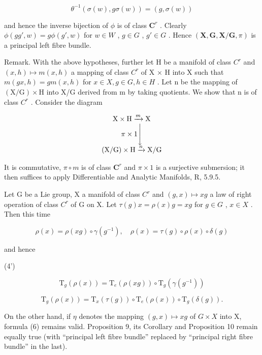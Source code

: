 \[
\theta^ {- 1} (\sigma (w), g \sigma (w)) = (g, \sigma (w))
\]

and hence the inverse bijection of \(\phi\) is of class \(\mathbf{C}^r\) . Clearly \(\phi(gg', w) = g\phi(g', w)\) for \(w \in W\) , \(g \in G\) , \(g' \in G\) . Hence \((\mathbf{X}, \mathbf{G}, \mathbf{X}/\mathbf{G}, \pi)\) is a principal left fibre bundle.

Remark. With the above hypotheses, further let H be a manifold of class \(C^{r}\) and \((x, h) \mapsto m(x, h)\) a mapping of class \(C^{r}\) of X × H into X such that \(m(gx, h) = gm(x, h)\) for \(x \in X, g \in G, h \in H\) . Let n be the mapping of \((\mathrm{X}/\mathrm{G}) \times \mathrm{H}\) into X/G derived from m by taking quotients. We show that n is of class \(C^{r}\) . Consider the diagram

\[
\begin{array}{c} \mathrm{X} \times \mathrm{H} \xrightarrow {m} \mathrm{X} \\ \pi \times 1 \Biggl \downarrow \\ (\mathrm{X} / \mathrm{G}) \times \mathrm{H} \xrightarrow {n} \mathrm{X} / \mathrm{G} \end{array}
\]

It is commutative, \(\pi \circ m\) is of class \(\mathbf{C}^r\) and \(\pi \times 1\) is a surjective submersion; it then suffices to apply Differentiable and Analytic Manifolds, R, 5.9.5.

Let G be a Lie group, X a manifold of class \(C^{r}\) and \((g, x) \mapsto xg\) a law of right operation of class \(C^{r}\) of G on X. Let \(\tau(g)x = \rho(x)g = xg\) for \(g \in G\) , \(x \in X\) . Then this time

\[
\rho (x) = \rho (x g) \circ \gamma (g ^ {- 1}), \quad \rho (x) = \tau (g) \circ \rho (x) \circ \delta (g)\tag{3'}
\]

and hence

(4')

\[
\mathrm{T} _ {g} (\rho (x)) = \mathrm{T} _ {e} (\rho (x g)) \circ \mathrm{T} _ {g} (\gamma (g ^ {- 1}))\tag{5'}
\]

\[
\mathrm{T} _ {g} (\rho (x)) = \mathrm{T} _ {x} (\tau (g)) \circ \mathrm{T} _ {e} (\rho (x)) \circ \mathrm{T} _ {g} (\delta (g)).
\]

On the other hand, if \(\eta\) denotes the mapping \((g, x) \mapsto xg\) of \(G \times X\) into X, formula (6) remains valid. Proposition 9, its Corollary and Proposition 10 remain equally true (with ``principal left fibre bundle'' replaced by ``principal right fibre bundle'' in the last).

